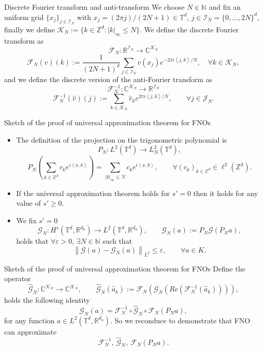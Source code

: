 \documentclass{beamer}
\newcommand{\numberset}{\mathbb}
\newcommand{\N}{\numberset{N}}
\newcommand{\Z}{\numberset{Z}}
\newcommand{\R}{\numberset{R}}
\newcommand{\C}{\numberset{C}}
\begin{document}

\begin{frame}[noframenumbering]{Discrete Fourier transform and anti-transform}
	We choose $ N \in \N $ and fix an uniform grid $ \{x_j\}_{j \in \mathcal{I}_N} $ with $ x_j = (2\pi j)/(2N+1) \in \mathbb{T}^d $, $ j \in \mathcal{I}_N = \{0, \dots, 2N\}^{d} $, finally we define $\mathcal{K}_N := \{k \in \Z^d : |k|_{\infty} \le N\}$.
	We define the discrete Fourier transform as
	\[ \mathcal{F}_{N}: \R^{\mathcal{I}_N} \to \C^{\mathcal{K}_N}\]\[ \mathcal{F}_{N}(v)(k) := \frac{1}{(2N+1)^{d}} \sum_{j \in \mathcal{I}_N}v(x_j) e^{-2\pi i \left\langle j, k \right\rangle/N }, \quad \forall k \in \mathcal{K}_N, \]
	and we define the discrete version of the anti-Fourier transform as
	\[ \mathcal{F}_{N}^{-1}: \C^{\mathcal{K}_N} \to \R^{\mathcal{I}_N}\]\[ \mathcal{F}_{N}^{-1}(\widehat{v})(j) := \sum_{k \in \mathcal{K}_N} \widehat{v}_k e^{2\pi i \left\langle j, k \right\rangle/N }, \qquad \forall j \in \mathcal{J}_N. \]
\end{frame}


\begin{frame}[noframenumbering]{Sketch of the proof of universal approximation theorem for FNOs}
	\centering
	\begin{itemize}
		\item The definition of the projection on the trigonometric polynomial is
		\[ P_N: L^{2}(\mathbb{T}^d) \to L^{2}_N(\mathbb{T}^d),  \]
		\[ P_N\left(\sum_{k \in \Z^d} c_k e^{i \left\langle x, k \right\rangle } \right) = \sum_{|k|_{\infty}\le N} c_k e^{i \left\langle x, k \right\rangle }, \qquad \forall (c_k)_{k \in \Z^d} \in \ell^2(\Z^d). \]
		\item If the universal approximation theorem holds for $ s'=0 $ then it holds for any value of $ s' \ge 0 $.
		\item We fix $ s' = 0 $  \[ \mathcal{G}_{N}: H^{s}(\mathbb{T}^d, \R^{d_a}) \to L^2(\mathbb{T}^d, \R^{d_u}), \qquad \mathcal{G}_{N}(a):= P_N  \mathcal{G} (P_Na), \]
		holds that $ \forall \varepsilon > 0 $, $ \exists N \in \N $ such that
		\[ \left\|\mathcal{G}(a) - \mathcal{G}_N(a) \right\|_{L^2} \le \varepsilon, \qquad \forall a \in K. \]
	\end{itemize}
\end{frame}


\begin{frame}[noframenumbering]{Sketch of the proof of universal approximation theorem for FNOs}
	Define the operator
	\[ \widehat{\mathcal{G}}_N: \C^{\mathcal{K}_N} \to\C^{\mathcal{K}_N}, \qquad \widehat{\mathcal{G}}_N(\widehat{a}_k) := \mathcal{F}_N (\mathcal{G}_N ( Re (\mathcal{F}_N^{-1}(\widehat{a}_k)))), \]
	holds the following identity
	\[ \mathcal{G}_N (a) = \mathcal{F}_N^{-1} \circ \widehat{\mathcal{G}}_N \circ \mathcal{F}_N (P_Na), \]
	for any function $  a \in L^2(\mathbb{T}^d, \R^{d_a}) $. So we reconduce to demonstrate that FNO can approximate	\[ \mathcal{F}_N^{-1}, \ \widehat{\mathcal{G}}_N , \ \mathcal{F}_N (P_Na). \]
\end{frame}
\end{document}

